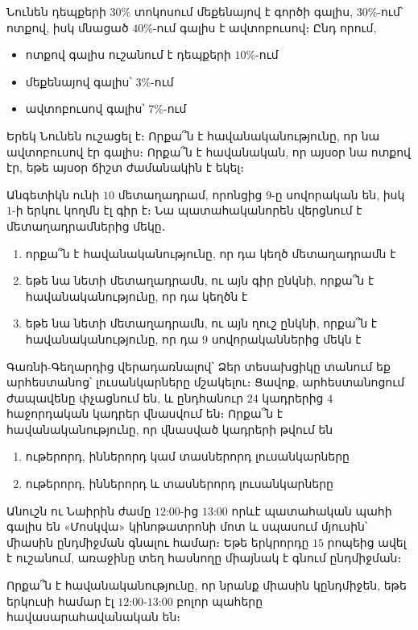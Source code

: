 \begin{problem}
Նունեն դեպքերի $30\%$ տոկոսում մեքենայով է գործի գալիս, $30\%$-ում՝ ոտքով, իսկ մնացած $40\%$-ում գալիս է ավտոբուսով։ Ընդ որում,
\begin{itemize}
    \item ոտքով գալիս ուշանում է դեպքերի $10\%$-ում
    \item մեքենայով գալիս՝ $3\%$-ում
    \item ավտոբուսով գալիս՝ $7\%$-ում
\end{itemize}
Երեկ Նունեն ուշացել է։ Որքա՞ն է հավանականությունը, որ նա ավտո\-բու\-սով էր գալիս։ Որքա՞ն է հավանական, որ այսօր նա ոտքով էր, եթե այսօր ճիշտ ժամանակին է եկել։
\end{problem}

\begin{problem}
Անգետիկն ունի $10$ մետաղադրամ, որոնցից $9$-ը սովորական են, իսկ $1$-ի երկու կողմն էլ գիր է։ Նա պատահականորեն վերցնում է մետաղադրամներից մեկը․
\begin{enumerate}[label={\alph*}․]
\item որքա՞ն է հավանականությունը, որ դա կեղծ մետաղադրամն է

\item եթե նա նետի մետաղադրամն, ու այն գիր ընկնի, որքա՞ն է հավանականությունը, որ դա կեղծն է

\item եթե նա նետի մետաղադրամն, ու այն ղուշ ընկնի, որքա՞ն է հավանականությունը, որ դա $9$ սովորականներից մեկն է
\end{enumerate}
\end{problem}

\begin{problem}
Գառնի-Գեղարդից վերադառնալով՝ Ձեր տեսախցիկը տանում եք արհեստանոց՝ լուսանկարները մշակելու։ Ցավոք, արհես\-տա\-նոցում ժապավենը փչացնում են, և ընդհանուր $24$ կադրերից $4$ հաջոր\-դական կադրեր վնասվում են։ Որքա՞ն է հավանականությունը, որ վնասված կադրերի թվում են
\begin{enumerate}[label={\alph*}․]
\item ութերորդ, իններորդ կամ տասներորդ լուսանկարները
\item ութերորդ, իններորդ և տասներորդ լուսանկարները
\end{enumerate}
\end{problem}

\begin{problem}
Անուշն ու Նաիրին ժամը $12$:$00$-ից $13$:$00$ որևէ պատահական պահի գալիս են «Մոսկվա» կինոթատրոնի մոտ և սպասում մյուսին՝ միասին ընդմիջման գնալու համար։ Եթե երկրորդը $15$ րոպեից ավել է ուշանում, առաջինը տեղ հասնողը միայնակ է գնում ընդմիջման։ 

Որքա՞ն է հավանականությունը, որ նրանք միասին կընդմիջեն, եթե երկուսի համար էլ $12$:$00$-$13$:$00$ բոլոր պահերը հավասարահավանական են։
\end{problem}

